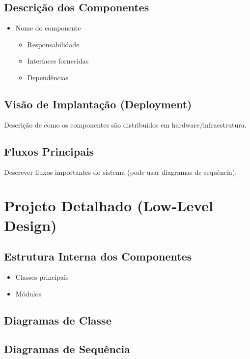\subsection{Descrição dos Componentes}
\begin{itemize}
    \item Nome do componente
    \begin{itemize}
        \item Responsabilidade
        \item Interfaces fornecidas
        \item Dependências
    \end{itemize}
\end{itemize}

\subsection{Visão de Implantação (Deployment)}
Descrição de como os componentes são distribuídos em hardware/infraestrutura.

\subsection{Fluxos Principais}
Descrever fluxos importantes do sistema (pode usar diagramas de sequência).

\section{Projeto Detalhado (Low-Level Design)}

\subsection{Estrutura Interna dos Componentes}
\begin{itemize}
    \item Classes principais
    \item Módulos
\end{itemize}

\subsection{Diagramas de Classe}

\subsection{Diagramas de Sequência}

